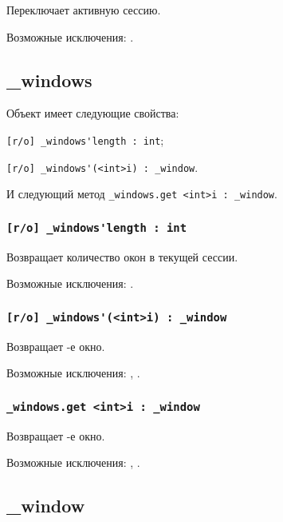 Переключает активную сессию.

Возможные исключения: .


\subsection{{\color{orange} \_windows}}

Объект \windows{} имеет следующие свойства:
\begin{icItems}
	\item \lstinline|[r/o] _windows'length : int|;
	\item \lstinline|[r/o] _windows'(<int>i) : _window|.
\end{icItems}

И следующий метод \lstinline|_windows.get <int>i : _window|.

\subsubsection{\lstinline|[r/o] _windows'length : int|}

Возвращает количество окон в текущей сессии.

Возможные исключения: .

\subsubsection{\lstinline|[r/o] _windows'(<int>i) : _window|}

Возвращает -е окно.

Возможные исключения: , .

\subsubsection{\lstinline|_windows.get <int>i : _window|}

Возвращает -е окно.

Возможные исключения: , .

\subsection{{\color{orange} \_window}}

